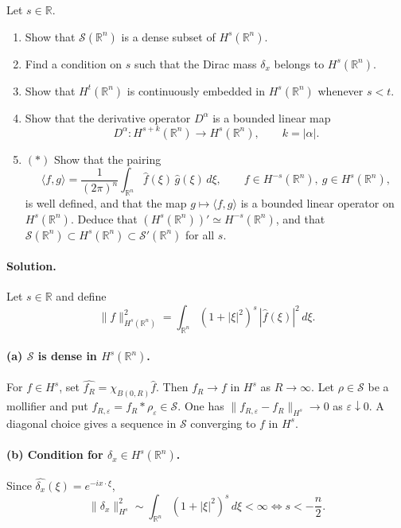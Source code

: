 \documentclass[12pt,a4paper]{article}
\theoremstyle{plain}
\theoremstyle{definition}
\theoremstyle{remark}
\theoremstyle{remark}
\begin{document}
Let $s\in\mathbb R$.

\begin{enumerate}[label=(\alph*)]
	\item Show that $\mathcal S(\mathbb R^n)$ is a dense subset of $H^s(\mathbb R^n)$.
	\item Find a condition on $s$ such that the Dirac mass $\delta_x$ belongs to $H^s(\mathbb R^n)$.
	\item Show that $H^t(\mathbb R^n)$ is continuously embedded in $H^s(\mathbb R^n)$ whenever $s<t$.
	\item Show that the derivative operator $D^\alpha$ is a bounded linear map
	\[
	D^\alpha : H^{s+k}(\mathbb R^n)\to H^s(\mathbb R^n),\qquad k=|\alpha|.
	\]
	\item $(*)$ Show that the pairing
	\[
	\langle f,g\rangle = \frac{1}{(2\pi)^n}\int_{\mathbb R^n} \widehat f(\xi)\,\widehat g(\xi)\,d\xi,
	\qquad f\in H^{-s}(\mathbb R^n),\ g\in H^s(\mathbb R^n),
	\]
	is well defined, and that the map $g\mapsto \langle f,g\rangle$ is a bounded linear operator on $H^s(\mathbb R^n)$.
	Deduce that $(H^s(\mathbb R^n))' \simeq H^{-s}(\mathbb R^n)$, and that
	$\mathcal S(\mathbb R^n)\subset H^s(\mathbb R^n)\subset \mathcal S'(\mathbb R^n)$ for all $s$.
\end{enumerate}

\bigskip

\paragraph{Solution.}

Let $s\in\mathbb R$ and define
\[
\|f\|_{H^s(\mathbb R^n)}^2=\int_{\mathbb R^n}(1+|\xi|^2)^s\,|\widehat f(\xi)|^2\,d\xi.
\]

\paragraph{(a) $\mathcal S$ is dense in $H^s(\mathbb R^n)$.}
For $f\in H^s$, set $\widehat{f_R}=\chi_{B(0,R)}\widehat f$. Then $f_R\to f$ in $H^s$ as $R\to\infty$.
Let $\rho\in\mathcal S$ be a mollifier and put $f_{R,\varepsilon}=f_R*\rho_\varepsilon\in\mathcal S$.
One has $\|f_{R,\varepsilon}-f_R\|_{H^s}\to0$ as $\varepsilon\downarrow0$. A diagonal choice gives a sequence in $\mathcal S$ converging to $f$ in $H^s$.

\smallskip

\paragraph{(b) Condition for $\delta_x\in H^s(\mathbb R^n)$.}
Since $\widehat{\delta_x}(\xi)=e^{-ix\cdot\xi}$,
\[
\|\delta_x\|_{H^s}^2\sim\int_{\mathbb R^n}(1+|\xi|^2)^s\,d\xi<\infty
\iff s<-\frac n2.
\]
\end{document}
